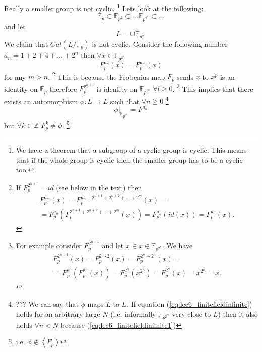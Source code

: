 Really a smaller group is not cyclic.
\footnote{
  We have a theorem that a subgroup of a cyclic group is cyclic. This
  means that if the whole group is cyclic then the smaller group has
  to be a cyclic too.
}
Lets look at the following:
\[
\mathbb{F}_p \subset \mathbb{F}_{p^2} \subset \dots
\mathbb{F}_{p^{2^n}} \subset \dots
\]
and let
\[
L = \cup \mathbb{F}_{p^{2^n}}
\]
We claim that $Gal\left(L/\mathbb{F}_p\right)$ is not cyclic. Consider
the following number $a_n = 1+ 2 + 4 + \dots + 2^n$ then
$\forall x \in \mathbb{F}_{p^{2^n}}$
\begin{equation}
  F_p^{a_n}\left(x\right) = F_p^{a_m}\left(x\right)
  \label{eq:lec6_finitefieldinfinite1}
\end{equation}
for any $m > n$.
\footnote{
  If $F_p^{2^{n+l}} = id$ (see below in the text) then
  \begin{eqnarray} 
  F_p^{a_m}\left(x\right) = F_p^{a_n + 2^{n + 1} + 2^{n+2} + \dots +
    2^m}\left(x\right) =
  \nonumber \\
  = F_p^{a_n}\left(F_p^{2^{n + 1} + 2^{n+2} + \dots +
    2^m}\left(x\right)\right) =
  F_p^{a_n}\left(id\left(x\right)\right) =
  F_p^{a_n}\left(x\right).
  \nonumber
  \end{eqnarray}
}
This is because the Frobenius map $F_p$ sends $x$ to $x^p$ is an
identity on $\mathbb{F}_p$ therefore $F_p^{2^{n+l}}$ is identity on
$\mathbb{F}_{p^{2^n}}$ $\forall l \ge 0$.
\footnote{
  For example consider $F_p^{2^{n+1}}$ and let $x \in x
  \in \mathbb{F}_{p^{2^n}}$. We have
  \begin{eqnarray}
  F_p^{2^{n+1}}\left(x\right) =
  F_p^{2^n \cdot 2}\left(x\right) =
  F_p^{2^n + 2^n}\left(x\right) =
  \nonumber \\
  =
  F_p^{2^n}\left(F_p^{2^n}\left(x\right)\right) =
  F_p^{2^n}\left(x^{2^n}\right) =
  F_p^{2^n}\left(x\right) = x^{2^n} = x.
  \nonumber
  \end{eqnarray}
}
This implies
that
there exists an automorphism $\phi: L \to L$ such that
$\forall n \ge 0$
\footnote{
  ??? We can say that $\phi$ maps $L$ to $L$. If equation
  (\ref{eq:lec6_finitefieldinfinite}) holds for an arbitrary large $N$
  (i.e. informally $\mathbb{F}_{p^{2^N}}$ very
  close  to $L$)
  then it also holds $\forall n < N$ because
  (\ref{eq:lec6_finitefieldinfinite1})
}
\begin{equation}
  \left.\phi\right|_{\mathbb{F}_{p^{2^n}}} = F^{a_n}
  \label{eq:lec6_finitefieldinfinite}
\end{equation}
but $\forall k \in \mathbb{Z}$ $F_p^k \ne \phi$.
\footnote{
  i.e. $\phi \notin \left<F_p\right>$
}
